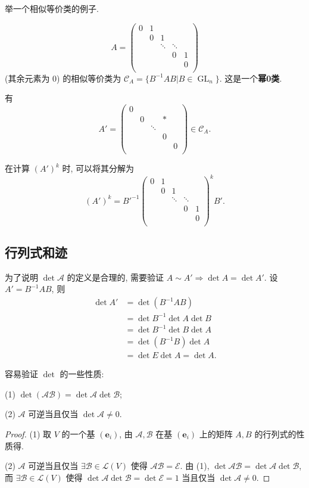 \documentclass{ctexart}
\begin{document}
举一个相似等价类的例子.
\begin{example}
    \[A=\begin{pmatrix}
        0 & 1 \\
        & 0 & 1 \\
        && \ddots & \ddots \\
        &&& 0 & 1 \\
        &&&& 0 \\
    \end{pmatrix}\]
    (其余元素为 $0$) 的相似等价类为 $\mathcal{C}_A=\{B^{-1}AB|B\in\operatorname{GL}_n\}$. 这是一个\textbf{幂0类}.

    有
    \[A'=\begin{pmatrix}
        0 \\
        & 0 && * \\
        && \ddots \\
        &&& 0 \\
        &&&& 0 \\
    \end{pmatrix}\in\mathcal{C}_A.\]

    在计算 $(A')^k$ 时, 可以将其分解为
    \[(A')^k=B'^{-1}\begin{pmatrix}
        0 & 1 \\
        & 0 & 1 \\
        && \ddots & \ddots \\
        &&& 0 & 1 \\
        &&&& 0 \\
    \end{pmatrix}^kB'.\]
\end{example}
\subsection{行列式和迹}
为了说明 $\det\mathcal{A}$ 的定义是合理的, 需要验证 $A\sim A'\Rightarrow\det A=\det A'$. 设 $A'=B^{-1}AB$, 则
\begin{align*}
    \det A' & =\det(B^{-1}AB) \\
    & =\det B^{-1}\det A\det B \\
    & =\det B^{-1}\det B\det A \\
    & =\det(B^{-1}B)\det A \\
    & =\det E\det A=\det A.
\end{align*}

容易验证 $\det$ 的一些性质:
\begin{property}
    (1) $\det(\mathcal{AB})=\det\mathcal{A}\det\mathcal{B}$;

    (2) $\mathcal{A}$ 可逆当且仅当 $\det\mathcal{A}\neq0$.
\end{property}
\begin{proof}
    (1) 取 $V$ 的一个基 $(\boldsymbol{e}_i)$, 由 $\mathcal{A},\mathcal{B}$ 在基 $(\boldsymbol{e}_i)$ 上的矩阵 $A,B$ 的行列式的性质得.

    (2) $\mathcal{A}$ 可逆当且仅当 $\exists\mathcal{B}\in\mathcal{L}(V)$ 使得 $\mathcal{AB}=\mathcal{E}$. 由 (1), $\det\mathcal{AB}=\det\mathcal{A}\det\mathcal{B}$, 而 $\exists\mathcal{B}\in\mathcal{L}(V)$ 使得 $\det\mathcal{A}\det\mathcal{B}=\det\mathcal{E}=1$ 当且仅当 $\det\mathcal{A}\neq0$.
\end{proof}
\end{document}
